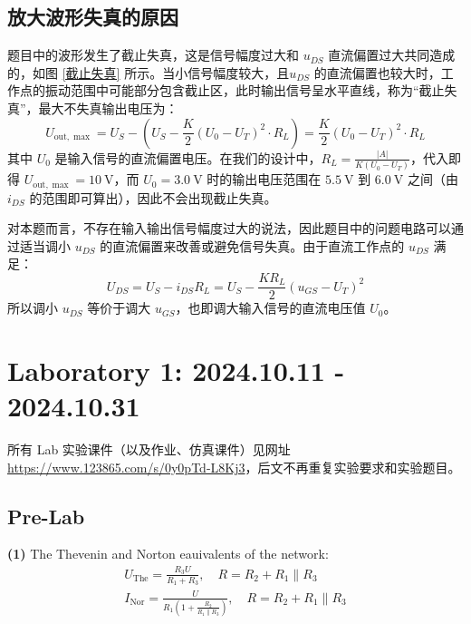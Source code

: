 \documentclass[UTF8]{report}
\theoremstyle{MyLineTheoremStyle} %
\theoremstyle{MyBlockTheoremStyle} %
\theoremstyle{MySubsubsectionStyle} %
\begin{document}
\section{放大波形失真的原因}
题目中的波形发生了截止失真，这是信号幅度过大和 $u_{DS}$ 直流偏置过大共同造成的，如图 \ref{截止失真} 所示。当小信号幅度较大，且$u_{DS}$ 的直流偏置也较大时，工作点的振动范围中可能部分包含截止区，此时输出信号呈水平直线，称为“截止失真”，最大不失真输出电压为：
\begin{equation}
    U_{\text{out}, \max} = U_S - \left(U_S - \frac{K}{2}(U_0 - U_T)^2\cdot R_L\right) = \frac{K}{2}(U_0 - U_T)^2\cdot R_L
\end{equation}
其中 $U_0$ 是输入信号的直流偏置电压。在我们的设计中，$R_L = \frac{| A |}{K(U_0 - U_T)}$，代入即得 $U_{\text{out}, \max} = 10 \ \mathrm{V}$，而 $U_0 = 3.0 \ \mathrm{V}$ 时的输出电压范围在 $5.5 \ \mathrm{V}$ 到 $6.0 \ \mathrm{V}$ 之间（由 $i_{DS}$ 的范围即可算出），因此不会出现截止失真。

对本题而言，不存在输入输出信号幅度过大的说法，因此题目中的问题电路可以通过适当调小 $u_{DS}$ 的直流偏置来改善或避免信号失真。由于直流工作点的 $u_{DS}$ 满足：
\begin{equation}
U_{DS} = U_S - i_{DS}R_L = U_S - \frac{KR_L}{2}\left(u_{GS} - U_T\right)^2
\end{equation}
所以调小 $u_{DS}$ 等价于调大 $u_{GS}$，也即调大输入信号的直流电压值 $U_0$。


\captionsetup[figure]{name=Figure}  
\captionsetup[table]{name=Table}







\chapter{Laboratory 1: 2024.10.11 - 2024.10.31}
\thispagestyle{fancy}

所有 Lab 实验课件（以及作业、仿真课件）见网址 \href{https://www.123865.com/s/0y0pTd-L8Kj3}{https://www.123865.com/s/0y0pTd-L8Kj3}，后文不再重复实验要求和实验题目。

\section{Pre-Lab}

\noindent \textbf{(1)}
The Thevenin and Norton eauivalents of the network:
\begin{gather}
U_{\text{The}} = \frac{R_3U}{R_1 + R_3},\quad R = R_2 + R_1 \parallel R_3 \\ 
I_{\text{Nor}} = \frac{U}{R_1 \left(1 + \frac{R_2}{R_1 \parallel R_3}\right)},\quad R = R_2 + R_1 \parallel R_3
\end{gather}
\end{document}
